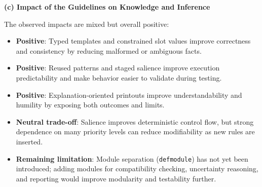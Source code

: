 \documentclass{article}
\begin{document}
\noindent\textbf{(c) Impact of the Guidelines on Knowledge and Inference}

The observed impacts are mixed but overall positive:

\begin{itemize}
    \item \textbf{Positive}: Typed templates and constrained slot values improve correctness and consistency by reducing malformed or ambiguous facts.
    \item \textbf{Positive}: Reused patterns and staged salience improve execution predictability and make behavior easier to validate during testing.
    \item \textbf{Positive}: Explanation-oriented printouts improve understandability and humility by exposing both outcomes and limits.
    \item \textbf{Neutral trade-off}: Salience improves deterministic control flow, but strong dependence on many priority levels can reduce modifiability as new rules are inserted.
    \item \textbf{Remaining limitation}: Module separation (\texttt{defmodule}) has not yet been introduced; adding modules for compatibility checking, uncertainty reasoning, and reporting would improve modularity and testability further.
\end{itemize}


\end{document}
